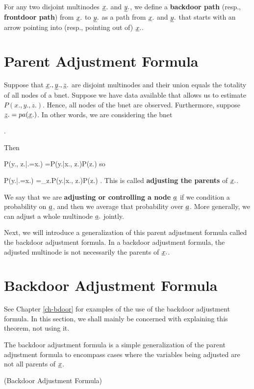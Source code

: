 For any two
disjoint
multinodes $\rvx.$
and $\rvy.$,
we define a {\bf backdoor path}  (resp., {\bf frontdoor path})
from $\rvx.$ to $\rvy.$
as a path from $\rvx.$
and $\rvy.$ that
starts with an arrow pointing into (resp., 
pointing out of)
$\rvx.$.


\section{Parent Adjustment Formula}


Suppose
that $\rvx., \rvy., \rvz.$
are disjoint multinodes
and their union equals
 the
totality of all nodes of
a bnet.
Suppose we have data
available that allows us  to
estimate $P(x., y., z.)$.
Hence, all nodes of the bnet
are observed.
Furthermore,
suppose $\rvz.=pa(\rvx.)$.
In other words,
we are
considering the bnet

\beq
{}
\;.
\eeq

Then

\beq
P(y., z.|\cald \rvx.=x.)
=P(y.|x., z.)P(z.)
\eeq
so

\beq
P(y.|\cald \rvx.=x.)
=\sum_{z.}P(y.|x., z.)P(z.)
\;.
\eeq
This is called
{\bf adjusting the parents}
of $\rvx.$.


We say that
we are {\bf adjusting
or controlling a node $\rva$}
if we condition
a probability on $\rva$, and
then we average
that probability over $\rva$.
More generally,
we can adjust a whole
multinode $\rva.$ jointly.

Next,
we will introduce
a generalization
of
this parent adjustment formula
called the
backdoor adjustment formula.
In a backdoor adjustment formula,
the adjusted multinode
is not necessarily
 the parents of $\rvx.$.

\section{Backdoor Adjustment Formula}

See Chapter \ref{ch-bdoor}
for examples of the use of the
backdoor adjustment formula.
In this section,
we shall mainly be
concerned with
explaining this
theorem, not using it.

The backdoor adjustment formula is a simple generalization
of the parent adjustment formula to encompass 
cases where the variables being adjusted are 
not all parents of $\rvx$.


\bdoordef

\begin{claim} (Backdoor
Adjustment Formula)

\bdoorclaim
\end{claim}
\proof

